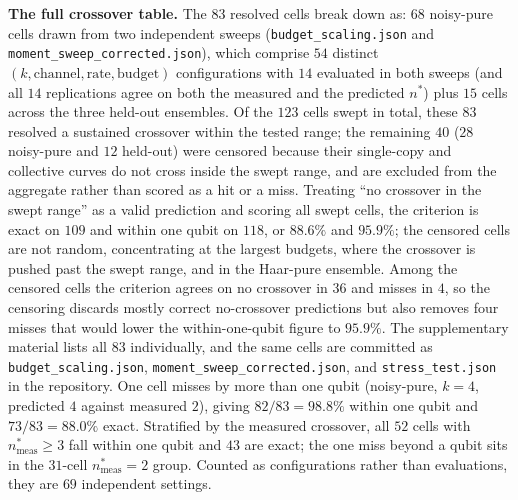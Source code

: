 \documentclass[a4paper,superscriptaddress,nofootinbib,onecolumn,nopdfoutputerror]{quantumarticle}
\begin{document}
\textbf{The full crossover table.} The 83 resolved cells break down as: \(68\) noisy-pure
cells drawn from two independent sweeps
(\texttt{budget\_scaling.json} and \texttt{moment\_\allowbreak sweep\_\allowbreak corrected.json}),
which comprise \(54\) distinct \((k, \text{channel}, \text{rate},
\text{budget})\) configurations with \(14\) evaluated in both sweeps
(and all \(14\) replications agree on both the measured and the predicted
\(n^*\)) plus \(15\) cells across the three held-out ensembles. Of the \(123\) cells swept in total, these \(83\) resolved a sustained crossover within the
tested range; the remaining \(40\) (\(28\) noisy-pure and
\(12\) held-out) were censored because their single-copy and collective
curves do not cross inside the swept range, and are excluded from the
aggregate rather than scored as a hit or a miss. Treating ``no crossover in the
swept range'' as a valid prediction and scoring all swept cells, the criterion is
exact on \(109\) and within one qubit on \(118\), or \(88.6\%\) and \(95.9\%\);
the censored cells are not random, concentrating at the largest budgets, where the
crossover is pushed past the swept range, and in the Haar-pure ensemble. Among the
censored cells the criterion agrees on no crossover in \(36\) and misses in \(4\),
so the censoring discards mostly correct no-crossover predictions but also removes
four misses that would lower the within-one-qubit figure to \(95.9\%\).
The supplementary material lists all \(83\) individually, and the same
cells are committed as \texttt{budget\_scaling.json},
\texttt{moment\_\allowbreak sweep\_\allowbreak corrected.json}, and
\texttt{stress\_test.json} in the repository. One cell misses by more than one
qubit (noisy-pure, \(k = 4\), predicted \(4\) against measured \(2\)),
giving \(82/83 = 98.8\%\) within one qubit and \(73/83 = 88.0\%\) exact.
Stratified by the measured crossover, all \(52\) cells with
\(n^*_{\text{meas}} \ge 3\) fall within one qubit and \(43\) are exact;
the one miss beyond a qubit sits in the \(31\)-cell
\(n^*_{\text{meas}} = 2\) group. Counted as configurations rather than evaluations, they are \(69\) independent
settings.
\end{document}

